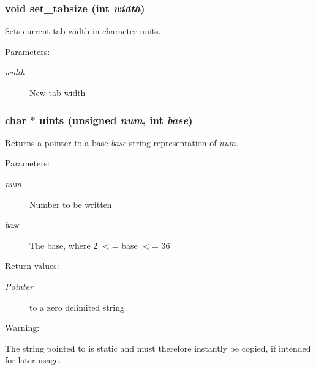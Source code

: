 \subsubsection{\setlength{\rightskip}{0pt plus 5cm}void set\_\-tabsize (int {\em width})}\label{hpconio_8h_a19}


Sets current tab width in character units.

\begin{Desc}
\item[Parameters: ]\par
\begin{description}
\item[{\em 
width}]New tab width \end{description}
\end{Desc}
\subsubsection{\setlength{\rightskip}{0pt plus 5cm}char $\ast$ uints (unsigned {\em num}, int {\em base})}\label{hpconio_8h_a3}


Returns a pointer to a base {\em base} string representation of {\em num}.

\begin{Desc}
\item[Parameters: ]\par
\begin{description}
\item[{\em 
num}]Number to be written \item[{\em 
base}]The base, where 2 $<$= base $<$= 36 \end{description}
\end{Desc}
\begin{Desc}
\item[Return values: ]\par
\begin{description}
\item[{\em 
Pointer}]to a zero delimited string \end{description}
\end{Desc}
\begin{Desc}
\item[Warning: ]\par
The string pointed to is static and must therefore instantly be copied, if intended for later usage. \end{Desc}
